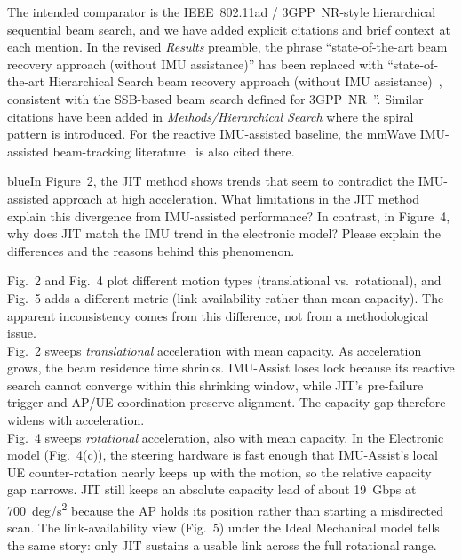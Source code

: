 \documentclass{article}
\newcommand{\blue}[1]{\begin{color}{blue}#1\end{color}}
\begin{document}
\noindent The intended comparator is the IEEE~802.11ad / 3GPP~NR-style hierarchical sequential beam search, and we have added explicit citations and brief context at each mention. In the revised \emph{Results} preamble, the phrase ``state-of-the-art beam recovery approach (without IMU assistance)'' has been replaced with ``state-of-the-art Hierarchical Search beam recovery approach (without IMU assistance)~\cite{photonics11060540}, consistent with the SSB-based beam search defined for 3GPP~NR~\cite{Giordani2018ATO, Heng2021SixChallenges}''. Similar citations have been added in \emph{Methods/Hierarchical Search} where the spiral pattern is introduced. For the reactive IMU-assisted baseline, the mmWave IMU-assisted beam-tracking literature~\cite{s141019622, Brambilla_2019, 9391649} is also cited there.

\begin{tcbremark}
{\selectfont
\blue{In Figure~2, the JIT method shows trends that seem to contradict the IMU-assisted approach at high acceleration. What limitations in the JIT method explain this divergence from IMU-assisted performance? In contrast, in Figure~4, why does JIT match the IMU trend in the electronic model? Please explain the differences and the reasons behind this phenomenon.}
}
\end{tcbremark}

\noindent Fig.~2 and Fig.~4 plot different motion types (translational vs.\ rotational), and Fig.~5 adds a different metric (link availability rather than mean capacity). The apparent inconsistency comes from this difference, not from a methodological issue.\\

\noindent Fig.~2 sweeps \emph{translational} acceleration with mean capacity. As acceleration grows, the beam residence time shrinks. IMU-Assist loses lock because its reactive search cannot converge within this shrinking window, while JIT's pre-failure trigger and AP/UE coordination preserve alignment. The capacity gap therefore widens with acceleration.\\

\noindent Fig.~4 sweeps \emph{rotational} acceleration, also with mean capacity. In the Electronic model (Fig.~4(c)), the steering hardware is fast enough that IMU-Assist's local UE counter-rotation nearly keeps up with the motion, so the relative capacity gap narrows. JIT still keeps an absolute capacity lead of about \SI{19}{Gbps} at \SI{700}{deg/s^2} because the AP holds its position rather than starting a misdirected scan. The link-availability view (Fig.~5) under the Ideal Mechanical model tells the same story: only JIT sustains a usable link across the full rotational range.\\
\end{document}
